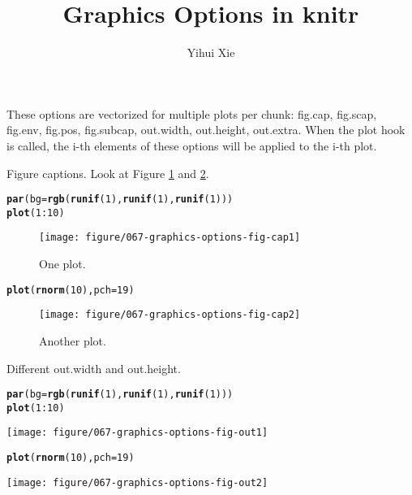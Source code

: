 \documentclass{article}\usepackage{graphicx, color}
\title{Graphics Options in knitr}
\author{Yihui Xie}
\makeatletter
\newcommand{\hlfunctioncall}[1]{\textcolor[rgb]{0.501960784313725,0,0.329411764705882}{\textbf{#1}}}%
\newenvironment{kframe}{%
 \def\at@end@of@kframe{}%
 \ifinner\ifhmode%
  \def\at@end@of@kframe{\end{minipage}}%
  \begin{minipage}{\columnwidth}%
 \fi\fi%
 \def\FrameCommand##1{\hskip\@totalleftmargin \hskip-\fboxsep
 \colorbox{shadecolor}{##1}\hskip-\fboxsep
     \hskip-\linewidth \hskip-\@totalleftmargin \hskip\columnwidth}%
 \MakeFramed {\advance\hsize-\width
   \@totalleftmargin\z@ \linewidth\hsize
   \@setminipage}}%
 {\par\unskip\endMakeFramed%
 \at@end@of@kframe}
\newenvironment{knitrout}{}{} %
\makeatother
\begin{document}
\maketitle




These options are vectorized for multiple plots per chunk: fig.cap, fig.scap, fig.env, fig.pos, fig.subcap, out.width, out.height, out.extra. When the plot hook is called, the i-th elements of these options will be applied to the i-th plot.

Figure captions. Look at Figure \ref{fig:fig-cap1} and \ref{fig:fig-cap2}.

\begin{knitrout}
\color{fgcolor}\begin{kframe}
\begin{alltt}
\hlfunctioncall{par}(bg = \hlfunctioncall{rgb}(\hlfunctioncall{runif}(1), \hlfunctioncall{runif}(1), \hlfunctioncall{runif}(1)))
\hlfunctioncall{plot}(1:10)
\end{alltt}
\end{kframe}\begin{figure}[H]

\texttt{[image: figure/067-graphics-options-fig-cap1]} \caption[One plot]{One plot.\label{fig:fig-cap1}}
\end{figure}

\begin{kframe}\begin{alltt}
\hlfunctioncall{plot}(\hlfunctioncall{rnorm}(10), pch = 19)
\end{alltt}
\end{kframe}\begin{figure}[H]

\texttt{[image: figure/067-graphics-options-fig-cap2]} \caption[Another plot]{Another plot.\label{fig:fig-cap2}}
\end{figure}


\end{knitrout}


Different out.width and out.height.

\begin{knitrout}
\color{fgcolor}\begin{kframe}
\begin{alltt}
\hlfunctioncall{par}(bg = \hlfunctioncall{rgb}(\hlfunctioncall{runif}(1), \hlfunctioncall{runif}(1), \hlfunctioncall{runif}(1)))
\hlfunctioncall{plot}(1:10)
\end{alltt}
\end{kframe}
\texttt{[image: figure/067-graphics-options-fig-out1]} 
\begin{kframe}\begin{alltt}
\hlfunctioncall{plot}(\hlfunctioncall{rnorm}(10), pch = 19)
\end{alltt}
\end{kframe}
\texttt{[image: figure/067-graphics-options-fig-out2]} 

\end{knitrout}
\end{document}
